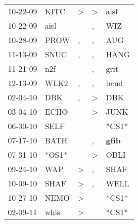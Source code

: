 \begin{supertabular}{p{0.07\textwidth}p{0.06\textwidth}p{0.02\textwidth}p{0.02\textwidth}p{0.06\textwidth}}
          10-22-09\textsuperscript{} &           KITC\textsuperscript{} &     \textgreater &  \textgreater &           aisl\textsuperscript{} \\
          10-22-09\textsuperscript{} &           aisl\textsuperscript{} &                  &             , &            WIZ\textsuperscript{} \\
          10-28-09\textsuperscript{} &           PROW\textsuperscript{} &                , &             , &            AUG\textsuperscript{} \\
          11-13-09\textsuperscript{} &           SNUC\textsuperscript{} &                , &             , &           HANG\textsuperscript{} \\
          11-21-09\textsuperscript{} &            n2f\textsuperscript{} &                  &             , &           grit\textsuperscript{} \\
          12-13-09\textsuperscript{} &           WLK2\textsuperscript{} &                , &             , &           bcud\textsuperscript{} \\
          02-04-10\textsuperscript{} &            DBK\textsuperscript{} &                , &  \textgreater &            DBK\textsuperscript{} \\
          03-04-10\textsuperscript{} &           ECHO\textsuperscript{} &                  &  \textgreater &           JUNK\textsuperscript{} \\
          06-30-10\textsuperscript{} &           SELF\textsuperscript{} &                  &               &                            *CS1* \\
          07-17-10\textsuperscript{} &           BATH\textsuperscript{} &                  &             , &  \textbf{gfib\textsuperscript{}} \\
          07-31-10\textsuperscript{} &                            *OS1* &                  &  \textgreater &           OBLI\textsuperscript{} \\
          09-24-10\textsuperscript{} &            WAP\textsuperscript{} &     \textgreater &             , &           SHAF\textsuperscript{} \\
          10-09-10\textsuperscript{} &           SHAF\textsuperscript{} &     \textgreater &             , &           WELL\textsuperscript{} \\
          10-27-10\textsuperscript{} &           NEMO\textsuperscript{} &     \textgreater &               &                            *CS1* \\
          02-09-11\textsuperscript{} &           whis\textsuperscript{} &     \textgreater &               &                            *CS1* \\

\end{supertabular}
